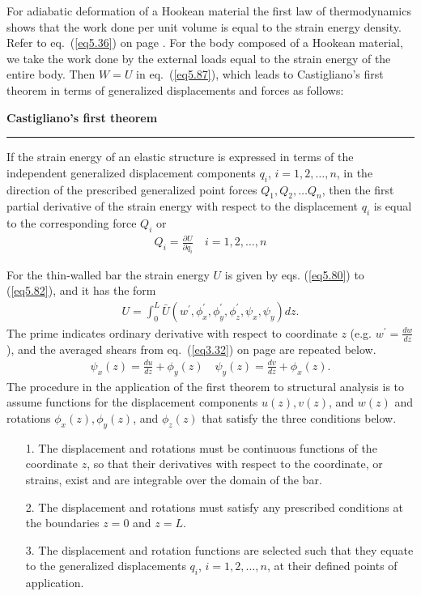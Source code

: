 \documentclass{AeroStructure-ERJohnson}
\begin{document}
For adiabatic deformation of a Hookean material the first law of thermodynamics shows that the work done per unit volume is equal to the strain energy density. Refer to eq.~(\ref{eq5.36}) on page \pageref{eq5.36}. For the body composed of a Hookean material, we take the work done by the external loads equal to the strain energy of the entire body. Then $W=U$ in eq.~(\ref{eq5.87}), which leads to Castigliano's first theorem in terms of generalized displacements and forces as follows:

\begin{framed}
\noindent\textbf{Castigliano's first theorem}\\
\hspace*{-10pt}\rule{37.45pc}{2pt}
If the strain energy of an elastic structure is expressed in terms of the independent generalized displacement components $q_{i}$, $i=1,2, \ldots, n$, in the direction of the prescribed generalized point forces $Q_{1}, Q_{2}, \ldots Q_{n}$, then the first partial derivative of the strain energy with respect to the displacement $q_{i}$ is equal to the corresponding force $Q_{i}$ or\vspace*{-4pt}
\begin{align*}
Q_{i}=\frac{\partial U}{\partial q_{i}} \quad i=1,2, \ldots, n
\end{align*}
\vspace*{-13pt}
\end{framed}

For the thin-walled bar the strain energy $U$ is given by eqs. (\ref{eq5.80}) to (\ref{eq5.82}), and it has the form
\begin{align*}
U=\int_{0}^{L} \bar{U}(w^{\prime}, \phi_{x}^{\prime}, \phi_{y}^{\prime}, \phi_{z}^{\prime}, \psi_{x}, \psi_{y}) d z.
\end{align*}
The prime indicates ordinary derivative with respect to coordinate $z$ \big(e.g. $w^{\prime}=\frac{d w}{d z}$\big), and the averaged shears from eq.~(\ref{eq3.32}) on page \pageref{eq3.32} are repeated below.
\begin{align*}
\psi_{x}(z)=\frac{d u}{d z}+\phi_{y}(z) \quad \psi_{y}(z)=\frac{d v}{d z}+\phi_{x}(z).
\end{align*}
The procedure in the application of the first theorem to structural analysis is to assume functions for the displacement components $u(z), v(z)$, and $w(z)$ and rotations $\phi_{x}(z), \phi_{y}(z)$, and $\phi_{z}(z)$ that satisfy the three conditions below.
\begin{enumerate}
\item[1.] The displacement and rotations must be continuous functions of the coordinate $z$, so that their derivatives with respect to the coordinate, or strains, exist and are integrable over the domain of the bar.

\item[2.] The displacement and rotations must satisfy any prescribed conditions at the boundaries $z = 0$ and $z = L$.

\item[3.] The displacement and rotation functions are selected such that they equate to the generalized displacements $q_{i}$, $i=1,2, \ldots, n$, at their defined points of application.
\end{enumerate}
\end{document}
